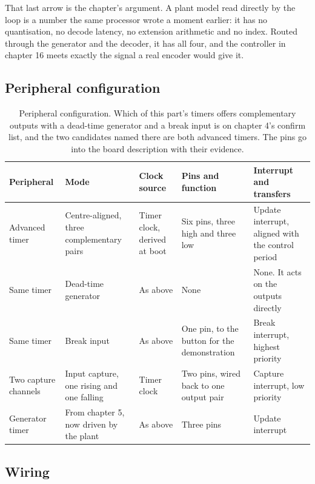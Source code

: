 That last arrow is the chapter's argument. A plant model read directly by the
loop is a number the same processor wrote a moment earlier: it has no
quantisation, no decode latency, no extension arithmetic and no index. Routed
through the generator and the decoder, it has all four, and the controller in
chapter 16 meets exactly the signal a real encoder would give it.

\subsection*{Peripheral configuration}

\begin{table}[H]\centering\small
\begin{tabular}{p{22mm}p{26mm}p{24mm}p{30mm}p{30mm}}
\toprule
Peripheral & Mode & Clock source & Pins and function & Interrupt and transfers \\
\midrule
Advanced timer & Centre-aligned, three complementary pairs & Timer clock, derived at boot & Six pins, three high and three low & Update interrupt, aligned with the control period \\
Same timer & Dead-time generator & As above & None & None. It acts on the outputs directly \\
Same timer & Break input & As above & One pin, to the button for the demonstration & Break interrupt, highest priority \\
Two capture channels & Input capture, one rising and one falling & Timer clock & Two pins, wired back to one output pair & Capture interrupt, low priority \\
Generator timer & From chapter 5, now driven by the plant & As above & Three pins & Update interrupt \\
\bottomrule
\end{tabular}
\caption{Peripheral configuration. Which of this part's timers offers complementary outputs with a dead-time generator and a break input is on chapter 4's confirm list, and the two candidates named there are both advanced timers. The pins go into the board description with their evidence.}
\end{table}

\subsection*{Wiring}


